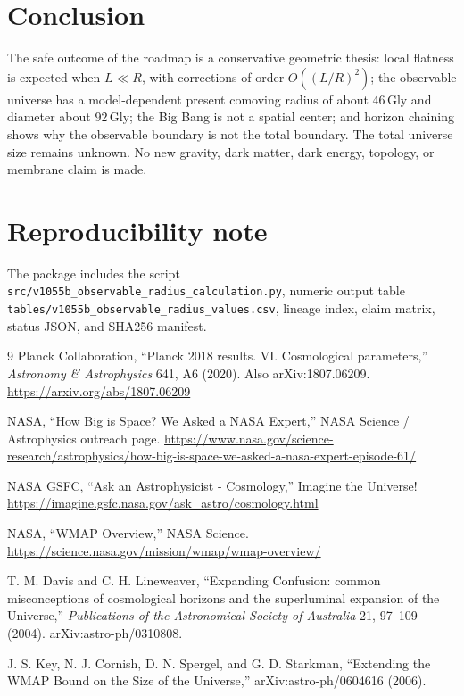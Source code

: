 \documentclass[11pt,a4paper]{article}
\newcommand{\Gly}{\,\mathrm{Gly}}
\begin{document}
\section{Conclusion}
The safe outcome of the roadmap is a conservative geometric thesis: local flatness is expected when $L\ll R$, with corrections of order $O((L/R)^2)$; the observable universe has a model-dependent present comoving radius of about $46\Gly$ and diameter about $92\Gly$; the Big Bang is not a spatial center; and horizon chaining shows why the observable boundary is not the total boundary. The total universe size remains unknown. No new gravity, dark matter, dark energy, topology, or membrane claim is made.

\section*{Reproducibility note}
The package includes the script \texttt{src/v1055b\_observable\_radius\_calculation.py}, numeric output table \texttt{tables/v1055b\_observable\_radius\_values.csv}, lineage index, claim matrix, status JSON, and SHA256 manifest.

\begin{thebibliography}{9}
Planck Collaboration, ``Planck 2018 results. VI. Cosmological parameters,'' \emph{Astronomy \& Astrophysics} 641, A6 (2020). Also arXiv:1807.06209. \url{https://arxiv.org/abs/1807.06209}

NASA, ``How Big is Space? We Asked a NASA Expert,'' NASA Science / Astrophysics outreach page. \url{https://www.nasa.gov/science-research/astrophysics/how-big-is-space-we-asked-a-nasa-expert-episode-61/}

NASA GSFC, ``Ask an Astrophysicist - Cosmology,'' Imagine the Universe! \url{https://imagine.gsfc.nasa.gov/ask_astro/cosmology.html}

NASA, ``WMAP Overview,'' NASA Science. \url{https://science.nasa.gov/mission/wmap/wmap-overview/}

T. M. Davis and C. H. Lineweaver, ``Expanding Confusion: common misconceptions of cosmological horizons and the superluminal expansion of the Universe,'' \emph{Publications of the Astronomical Society of Australia} 21, 97--109 (2004). arXiv:astro-ph/0310808.

J. S. Key, N. J. Cornish, D. N. Spergel, and G. D. Starkman, ``Extending the WMAP Bound on the Size of the Universe,'' arXiv:astro-ph/0604616 (2006).
\end{thebibliography}
\end{document}
